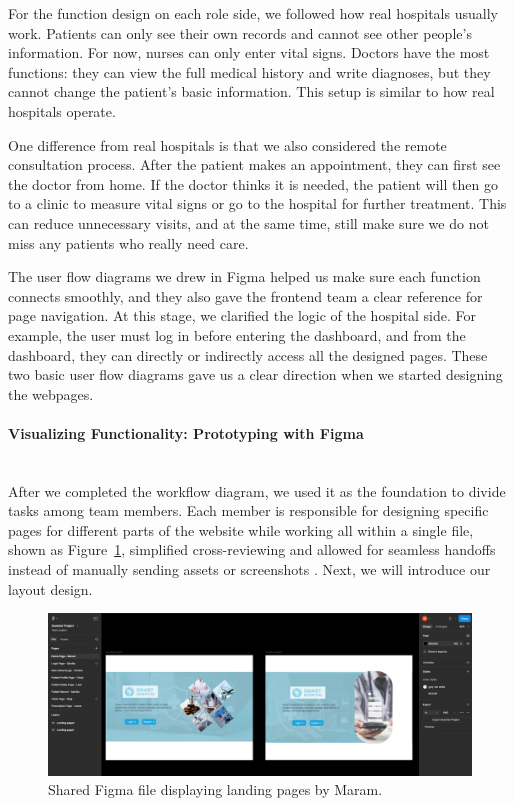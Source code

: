 For the function design on each role side, we followed how real hospitals usually work.
Patients can only see their own records and cannot see other people’s information.
For now, nurses can only enter vital signs.
Doctors have the most functions: they can view the full medical history and write diagnoses,
but they cannot change the patient’s basic information.
This setup is similar to how real hospitals operate. 

One difference from real hospitals is that we also considered the remote consultation process.
After the patient makes an appointment, they can first see the doctor from home.
If the doctor thinks it is needed, the patient will then go to a clinic to measure vital signs
or go to the hospital for further treatment.
This can reduce unnecessary visits, and at the same time, still make sure we do not miss any patients who really need care.

The user flow diagrams we drew in Figma helped us make sure each function connects smoothly,
and they also gave the frontend team a clear reference for page navigation.
At this stage, we clarified the logic of the hospital side.
For example, the user must log in before entering the dashboard,
and from the dashboard, they can directly or indirectly access all the designed pages.
These two basic user flow diagrams gave us a clear direction when we started designing the webpages.

\paragraph{Visualizing Functionality: Prototyping with Figma}\mbox{}\\
After we completed the workflow diagram, we used it as the foundation to divide tasks among team members. Each member is responsible for designing specific pages for different parts of the website while working all within a single file, shown as Figure~\ref{fig:3-2-2-DS-figma-f1}, simplified cross-reviewing and allowed for seamless handoffs instead of manually sending assets or screenshots . Next, we will introduce our layout design.
\begin{figure}[H]
  \centering
  \includegraphics[width=0.8\linewidth]{images03/3-2-2-figure1.png}
  \caption{Shared Figma file displaying landing pages by Maram.}
  \label{fig:3-2-2-DS-figma-f1}
\end{figure}

